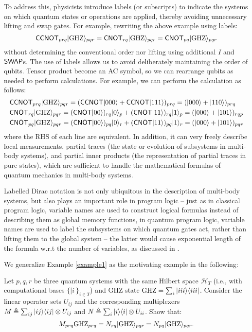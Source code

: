 To address this, physicists introduce labels (or subscripts) to indicate the systems on which quantum states or operations are applied, thereby avoiding unnecessary lifting and swap gates. For example, rewriting the above example using labels:
\begin{align*}
  {\mathsf{CCNOT}}_{prq}|{\mathrm{GHZ}}\rangle_{pqr} = 
  {\mathsf{CNOT}}_{rq}|{\mathrm{GHZ}}\rangle_{pqr}
  = {\mathsf{CNOT}}_{pq}|{\mathrm{GHZ}}\rangle_{pqr}
\end{align*}
without determining the conventional order nor lifting using additional $I$ and ${\mathsf{SWAP}}$s. 
The use of labels allows us to avoid deliberately maintaining the order of qubits. Tensor product become an AC symbol, so we can rearrange qubits as needed to perform calculations. For example, we can perform the calculation as follows:
\begin{align*}
  &{\mathsf{CCNOT}}_{prq}|{\mathrm{GHZ}}\rangle_{pqr}
  = ({\mathsf{CCNOT}}|000\rangle + {\mathsf{CCNOT}}|111\rangle)_{prq}
  = (|000\rangle + |110\rangle)_{prq}\\
  &{\mathsf{CNOT}}_{rq}|{\mathrm{GHZ}}\rangle_{pqr}
  = ({\mathsf{CNOT}}|00\rangle)_{rq}|0\rangle_p + ({\mathsf{CNOT}}|11\rangle)_{rq}|1\rangle_p
  =(|000\rangle + |101\rangle)_{rqp}\\
  &{\mathsf{CNOT}}_{pq}|{\mathrm{GHZ}}\rangle_{pqr}
  = ({\mathsf{CNOT}}|00\rangle)_{pq}|0\rangle_r + ({\mathsf{CNOT}}|11\rangle)_{pq}|1\rangle_r
  = (|000\rangle + |101\rangle)_{pqr}
\end{align*}
where the RHS of each line are equivalent.
In addition, it can very freely describe local measurements, partial traces (the state or evolution of subsystems in multi-body systems), and partial inner products (the representation of partial traces in pure states), which are sufficient to handle the mathematical formulas of quantum mechanics in multi-body systems.

Labelled Dirac notation is not only ubiquitous in the description of multi-body systems, but also plays an important role in program logic -- just as in classical program logic, variable names are used to construct logical formulas instead of describing them as global memory functions, in quantum program logic, variable names are used to label the subsystems on which quantum gates act, rather than lifting them to the global system -- the latter would cause exponential length of the formula w.r.t the number of variables, as discussed in \cite{}.

We generalize Example \ref{example1} as the motivating example in the following:
\begin{example}
  \label{ex: motivating}
  Let $p,q,r$ be three quantum systems with the same Hilbert space \( \mathcal{H}_T \) (i.e., with computational bases $\{|i\>\}_{i\in T}$) and GHZ state ${\mathrm{GHZ}} = \sum_i|iii\rangle\langle iii|$. Consider the linear operator sets $U_{ij}$ and the corresponding multiplexers $M\triangleq \sum_{ij}|ij\rangle\langle ij|\otimes U_{ij}$ and $N\triangleq \sum_i|i\rangle\langle i|\otimes U_{ii}$. Show that:
  $$M_{prq}{\mathrm{GHZ}}_{prq} = N_{rq}|{\mathrm{GHZ}}\rangle_{pqr} = N_{pq}|{\mathrm{GHZ}}\rangle_{pqr}.$$
\end{example}

